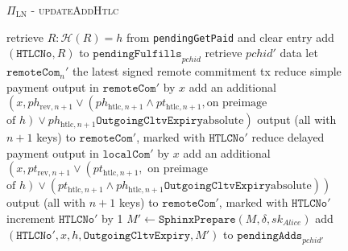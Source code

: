 \begin{figure}[H]
\begin{protocolbox}{$\Pi_{\mathrm{LN}}$ - \textsc{updateAddHtlc}}
\begin{algorithmic}[1]
            \State retrieve $R : \mathcal{H}\left(R\right) = h$ from
            \texttt{pendingGetPaid} and clear entry
            \State add $\left(\mathtt{HTLCNo}, R\right)$ to
            $\mathtt{pendingFulfills}_{\mathit{pchid}}$
           
            \State retrieve $\mathit{pchid}'$ data
            \State let $\mathtt{remoteCom}_n'$ the latest signed remote
            commitment tx
            \State reduce simple payment output in $\mathtt{remoteCom}'$ by $x$
            \State add an additional $\left(x, ph_{\mathrm{rev}, n+1} \vee
            \left(ph_{\mathrm{htlc}, n+1} \wedge pt_{\mathrm{htlc}, n+1}, \text{
            on preimage}\right.\right.$ $\left.\left.\text{of } h\right) \vee
            ph_{\mathrm{htlc}, n+1}\mathtt{OutgoingCltvExpiry} \text{
            absolute}\right)$ output (all with $n+1$ keys) to
            $\mathtt{remoteCom}'$, marked with $\texttt{HTLCNo}'$
            \State reduce delayed payment output in $\mathtt{localCom}'$ by $x$
            \State add an additional $\left(x, pt_{\mathrm{rev}, n+1} \vee
            \left(pt_{\mathrm{htlc}, n+1}, \text{ on preimage}\right.\right.$
            $\left.\left.\text{of } h\right) \vee \left(pt_{\mathrm{htlc}, n+1}
            \wedge ph_{\mathrm{htlc}, n+1}\mathtt{OutgoingCltvExpiry} \text{
            absolute}\right)\right)$ output (all with $n+1$ keys) to
            $\mathtt{remoteCom}'$, marked with $\texttt{HTLCNo}'$
            \State increment $\texttt{HTLCNo}'$ by 1
            \State $M' \gets \mathtt{SphinxPrepare}\left(M, \delta,
            sk_{\mathit{Alice}}\right)$
            \State add $\left(\mathtt{HTLCNo}', x, h,
            \mathtt{OutgoingCltvExpiry}, M'\right)$ to
            $\mathtt{pendingAdds}_{\mathit{pchid}'}$
          \EndIf
        \EndIndent
      \end{algorithmic}
    \end{protocolbox}
    \caption{}
    \label{alg:protocol:pay:updateAddHtlc}
  \end{figure}

